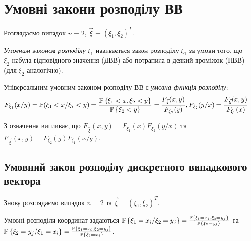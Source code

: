 
\section{Умовні закони розподілу ВВ}

Розглядаємо випадок $n = 2$, $\vec{\xi} = \left(\xi_1, \xi_2\right)^T$.

\begin{definition}
    \emph{Умовним законом розподілу} $\xi_1$ називається закон розподілу 
    $\xi_1$ за умови того, що $\xi_2$ набула відповідного значення (ДВВ) 
    або потрапила в деякий проміжок (НВВ) (для $\xi_2$ аналогічно).
\end{definition}

\begin{definition}
    Універсальним умовним законом розподілу ВВ є \emph{умовна функція 
    розподілу}:
    \begin{equation*}
        F_{\xi_1}(x/y) = \P({\xi_1 < x}/{\xi_2 < y}) = 
        \frac{\P\left\{\xi_1 < x, \xi_2 < y\right\}}
        {\P\left\{\xi_2 < y\right\}} = 
        \frac{F_{\vec{\xi}}(x, y)}{F_{\xi_2}(y)}, F_{\xi_2}(y/x) = \frac{F_{\vec{\xi}}(x, y)}{F_{\xi_1}(x)}
    \end{equation*}
\end{definition}
\begin{remark}
    З означення випливає, що 
    $F_{\vec{\xi}}(x,y) = F_{\xi_1}(x)F_{\xi_2}(y/x)$
    та 
    $F_{\vec{\xi}}(x,y) = F_{\xi_2}(y)F_{\xi_1}(x/y)$.
\end{remark}
\subsection{Умовний закон розподілу дискретного випадкового вектора}
Знову розглядаємо випадок $n=2$ та $\vec{\xi} = (\xi_1, \xi_2)^T$.

Умовні розподіли координат задаються $\P\left\{\xi_1 = x_i / \xi_2 = y_j\right\} = 
\frac{\P\left\{\xi_1 = x_i , \xi_2 = y_j\right\}}
{\P\left\{\xi_2 = y_j\right\}}$ та \\ 
$\P\left\{\xi_2 = y_j / \xi_1 = x_i\right\} = 
\frac{\P\left\{\xi_1 = x_i , \xi_2 = y_j\right\}}
{\P\left\{\xi_1 = x_i\right\}}$.

